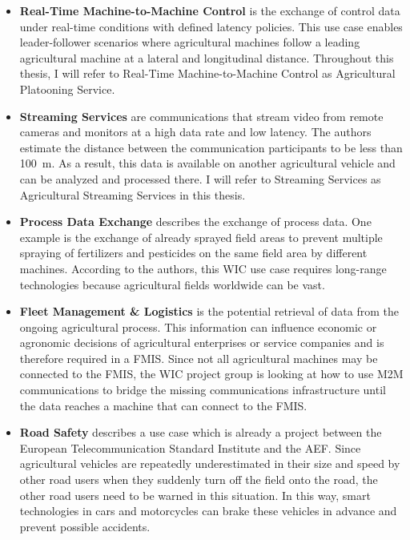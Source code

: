 \begin{itemize}
	\item \textbf{Real-Time Machine-to-Machine Control} is the exchange of control data under real-time conditions with defined latency policies. This use case enables leader-follower scenarios where agricultural machines follow a leading agricultural machine at a lateral and longitudinal distance. Throughout this thesis, I will refer to Real-Time Machine-to-Machine Control as Agricultural Platooning Service.
	\item \textbf{Streaming Services} are communications that stream video from remote cameras and monitors at a high data rate and low latency. The authors estimate the distance between the communication participants to be less than \SI{100}{\metre}. As a result, this data is available on another agricultural vehicle and can be analyzed and processed there.
	I will refer to Streaming Services as Agricultural Streaming Services in this thesis. %
	\item \textbf{Process Data Exchange} describes the exchange of process data. One example is the exchange of already sprayed field areas to prevent multiple spraying of fertilizers and pesticides on the same field area by different machines. According to the authors, this \ac{WIC} use case requires long-range technologies because agricultural fields worldwide can be vast.
	\item \textbf{Fleet Management \& Logistics} is the potential retrieval of data from the ongoing agricultural process. This information can influence economic or agronomic decisions of agricultural enterprises or service companies and is therefore required in a \ac{FMIS}.
	Since not all agricultural machines may be connected to the \ac{FMIS}, the \ac{WIC} project group is looking at how to use \ac{M2M} communications to bridge the missing communications infrastructure until the data reaches a machine that can connect to the \ac{FMIS}.
	\item \textbf{Road Safety} describes a use case which is already a project between the European Telecommunication Standard Institute and the \ac{AEF}. Since agricultural vehicles are repeatedly underestimated in their size and speed by other road users when they suddenly turn off the field onto the road, the other road users need to be warned in this situation. In this way, smart technologies in cars and motorcycles can brake these vehicles in advance and prevent possible accidents.
\end{itemize}

